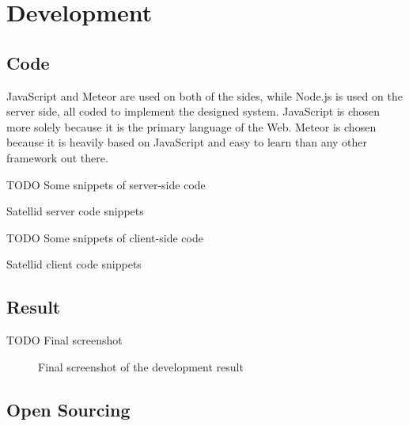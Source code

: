 \section{Development}
\label{sec:development}

\subsection{Code}

JavaScript and Meteor are used on both of the sides, while Node.js is used on the server side, all coded to implement the designed system.
JavaScript is chosen more solely because it is the primary language of the Web.
Meteor is chosen because it is heavily based on JavaScript and easy to learn than any other framework out there.

TODO Some snippets of server-side code

\begin{listing}[htbp]
  \caption{Satellid server code snippets}
  \label{lst:satellid-code-server}
\end{listing}

TODO Some snippets of client-side code

\begin{listing}[htbp]
  \caption{Satellid client code snippets}
  \label{lst:satellid-code-client}
\end{listing}

\subsection{Result}

TODO Final screenshot

\begin{figure}[htb]
  \centering
  \caption{Final screenshot of the development result}
  \label{fig:satellid-result}
\end{figure}

\subsection{Open Sourcing}

